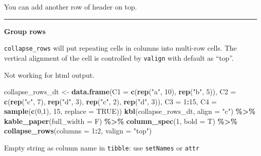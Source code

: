 \documentclass[
  a4paper,
  twoside,
  openright]{book}
\newenvironment{Shaded}{\begin{snugshade}}{\end{snugshade}}
\newcommand{\AttributeTok}[1]{\textcolor[rgb]{0.13,0.29,0.53}{#1}}
\newcommand{\ConstantTok}[1]{\textcolor[rgb]{0.56,0.35,0.01}{#1}}
\newcommand{\DecValTok}[1]{\textcolor[rgb]{0.00,0.00,0.81}{#1}}
\newcommand{\FunctionTok}[1]{\textcolor[rgb]{0.13,0.29,0.53}{\textbf{#1}}}
\newcommand{\NormalTok}[1]{#1}
\newcommand{\OtherTok}[1]{\textcolor[rgb]{0.56,0.35,0.01}{#1}}
\newcommand{\SpecialCharTok}[1]{\textcolor[rgb]{0.81,0.36,0.00}{\textbf{#1}}}
\newcommand{\StringTok}[1]{\textcolor[rgb]{0.31,0.60,0.02}{#1}}
\theoremstyle{definition}
\theoremstyle{definition}
\theoremstyle{definition}
\theoremstyle{definition}
\theoremstyle{remark}
\begin{document}
You can add another row of header on top.

\begin{center}\rule{0.5\linewidth}{0.5pt}\end{center}

\textbf{Group rows}

\texttt{collapse\_rows} will put repeating cells in columns into multi-row cells. The vertical alignment of the cell is controlled by \texttt{valign} with default as ``top''.

Not working for html output.

\begin{Shaded}
\begin{Highlighting}[]
\NormalTok{collapse\_rows\_dt }\OtherTok{\textless{}{-}} \FunctionTok{data.frame}\NormalTok{(}\AttributeTok{C1 =} \FunctionTok{c}\NormalTok{(}\FunctionTok{rep}\NormalTok{(}\StringTok{"a"}\NormalTok{, }\DecValTok{10}\NormalTok{), }\FunctionTok{rep}\NormalTok{(}\StringTok{"b"}\NormalTok{, }\DecValTok{5}\NormalTok{)),}
                 \AttributeTok{C2 =} \FunctionTok{c}\NormalTok{(}\FunctionTok{rep}\NormalTok{(}\StringTok{"c"}\NormalTok{, }\DecValTok{7}\NormalTok{), }\FunctionTok{rep}\NormalTok{(}\StringTok{"d"}\NormalTok{, }\DecValTok{3}\NormalTok{), }\FunctionTok{rep}\NormalTok{(}\StringTok{"c"}\NormalTok{, }\DecValTok{2}\NormalTok{), }\FunctionTok{rep}\NormalTok{(}\StringTok{"d"}\NormalTok{, }\DecValTok{3}\NormalTok{)),}
                 \AttributeTok{C3 =} \DecValTok{1}\SpecialCharTok{:}\DecValTok{15}\NormalTok{,}
                 \AttributeTok{C4 =} \FunctionTok{sample}\NormalTok{(}\FunctionTok{c}\NormalTok{(}\DecValTok{0}\NormalTok{,}\DecValTok{1}\NormalTok{), }\DecValTok{15}\NormalTok{, }\AttributeTok{replace =} \ConstantTok{TRUE}\NormalTok{))}
\FunctionTok{kbl}\NormalTok{(collapse\_rows\_dt, }\AttributeTok{align =} \StringTok{"c"}\NormalTok{) }\SpecialCharTok{\%\textgreater{}\%}
  \FunctionTok{kable\_paper}\NormalTok{(}\AttributeTok{full\_width =}\NormalTok{ F) }\SpecialCharTok{\%\textgreater{}\%}
  \FunctionTok{column\_spec}\NormalTok{(}\DecValTok{1}\NormalTok{, }\AttributeTok{bold =}\NormalTok{ T) }\SpecialCharTok{\%\textgreater{}\%}
  \FunctionTok{collapse\_rows}\NormalTok{(}\AttributeTok{columns =} \DecValTok{1}\SpecialCharTok{:}\DecValTok{2}\NormalTok{, }\AttributeTok{valign =} \StringTok{"top"}\NormalTok{)}
\end{Highlighting}
\end{Shaded}

Empty string as column name in \texttt{tibble}: use \texttt{setNames} or \texttt{attr}
\end{document}
